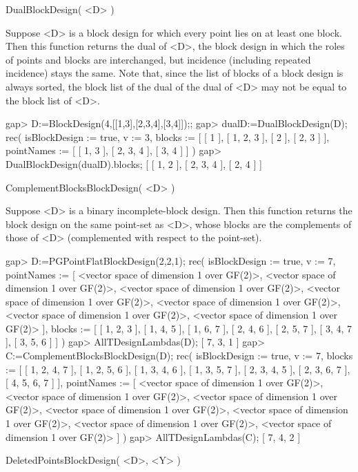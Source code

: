 \>DualBlockDesign( <D> )

Suppose <D> is a block design for which every point lies on at least
one block.  Then this function returns the dual of <D>, the block design
in which the roles of points and blocks are interchanged, but incidence
(including repeated incidence) stays the same.  Note that, since the
list of blocks of a block design is always sorted, the block list of
the dual of the dual of <D> may not be equal to the block list of <D>.

\beginexample
gap> D:=BlockDesign(4,[[1,3],[2,3,4],[3,4]]);;
gap> dualD:=DualBlockDesign(D);
rec( isBlockDesign := true, v := 3, 
  blocks := [ [ 1 ], [ 1, 2, 3 ], [ 2 ], [ 2, 3 ] ], 
  pointNames := [ [ 1, 3 ], [ 2, 3, 4 ], [ 3, 4 ] ] )
gap> DualBlockDesign(dualD).blocks;           
[ [ 1, 2 ], [ 2, 3, 4 ], [ 2, 4 ] ]
\endexample



\>ComplementBlocksBlockDesign( <D> )

Suppose <D> is a binary incomplete-block design.
Then this function returns the block design on the same
point-set as <D>, whose blocks are the complements of
those of <D> (complemented with respect to the point-set).

\beginexample
gap> D:=PGPointFlatBlockDesign(2,2,1);
rec( isBlockDesign := true, v := 7, 
  pointNames := [ <vector space of dimension 1 over GF(2)>, 
      <vector space of dimension 1 over GF(2)>, 
      <vector space of dimension 1 over GF(2)>, 
      <vector space of dimension 1 over GF(2)>, 
      <vector space of dimension 1 over GF(2)>, 
      <vector space of dimension 1 over GF(2)>, 
      <vector space of dimension 1 over GF(2)> ], 
  blocks := [ [ 1, 2, 3 ], [ 1, 4, 5 ], [ 1, 6, 7 ], [ 2, 4, 6 ], 
      [ 2, 5, 7 ], [ 3, 4, 7 ], [ 3, 5, 6 ] ] )
gap> AllTDesignLambdas(D);
[ 7, 3, 1 ]
gap> C:=ComplementBlocksBlockDesign(D);
rec( isBlockDesign := true, v := 7, 
  blocks := [ [ 1, 2, 4, 7 ], [ 1, 2, 5, 6 ], [ 1, 3, 4, 6 ], [ 1, 3, 5, 7 ], 
      [ 2, 3, 4, 5 ], [ 2, 3, 6, 7 ], [ 4, 5, 6, 7 ] ], 
  pointNames := [ <vector space of dimension 1 over GF(2)>, 
      <vector space of dimension 1 over GF(2)>, 
      <vector space of dimension 1 over GF(2)>, 
      <vector space of dimension 1 over GF(2)>, 
      <vector space of dimension 1 over GF(2)>, 
      <vector space of dimension 1 over GF(2)>, 
      <vector space of dimension 1 over GF(2)> ] )
gap> AllTDesignLambdas(C);
[ 7, 4, 2 ]
\endexample



\>DeletedPointsBlockDesign( <D>, <Y> )

